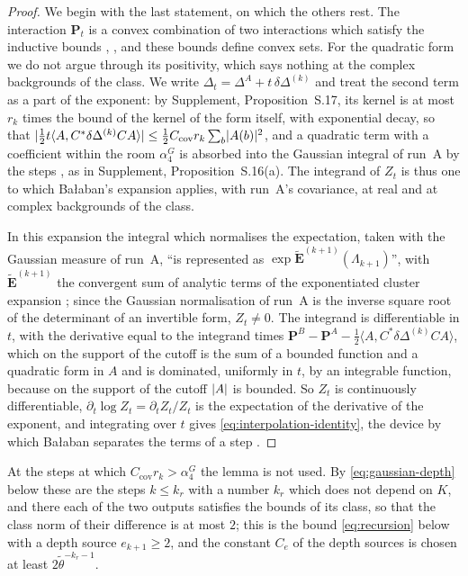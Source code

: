 \documentclass[11pt]{preprint}
\DeclarePairedDelimiter{\abs}{\lvert}{\rvert}
\numberwithin{equation}{section}
\theoremstyle{definition}
\theoremstyle{remark}
\theoremstyle{plain}
\begin{document}
\begin{proof}
We begin with the last statement, on which the others rest. The interaction $\mathbf P_t$ is a convex combination of two interactions which satisfy the inductive bounds \cite[(1.18), p.~263]{BalabanRG1}, \cite[(2.31), (2.42)]{BalabanCRE}, and these bounds define convex sets. For the quadratic form we do not argue through its positivity, which says nothing at the complex backgrounds of the class. We write $\Delta_t = \Delta^A + t\,\delta\Delta^{(k)}$ and treat the second term as a part of the exponent: by Supplement, Proposition~S.17, its kernel is at most $r_k$ times the bound of the kernel of the form itself, with exponential decay, so that $\abs{\frac12t\langle A, C^*\delta\Delta^{(k)}CA\rangle} \leq \frac12C_{\mathrm{cov}}r_k\sum_b\abs{A(b)}^2$, and a quadratic term with a coefficient within the room $\alpha^G_4$ is absorbed into the Gaussian integral of run~A by the steps \cite[(2.14)--(2.25), pp.~15--17]{BalabanRG2}, as in Supplement, Proposition~S.16(a). The integrand of $Z_t$ is thus one to which Ba{\l}aban's expansion applies, with run~A's covariance, at real and at complex backgrounds of the class.

In this expansion the integral which normalises the expectation, taken with the Gaussian measure of run~A, ``is represented as $\exp\tilde{\mathbf E}^{(k+1)}(\Lambda_{k+1})$'', with $\tilde{\mathbf E}^{(k+1)}$ the convergent sum of analytic terms of the exponentiated cluster expansion \cite[p.~277]{BalabanCRE}; since the Gaussian normalisation of run~A is the inverse square root of the determinant of an invertible form, $Z_t \neq 0$. The integrand is differentiable in $t$, with the derivative equal to the integrand times $\mathbf P^B - \mathbf P^A - \frac12\langle A, C^*\delta\Delta^{(k)}CA\rangle$, which on the support of the cutoff is the sum of a bounded function and a quadratic form in $A$ and is dominated, uniformly in $t$, by an integrable function, because on the support of the cutoff $\abs A$ is bounded. So $Z_t$ is continuously differentiable, $\partial_t\log Z_t = \partial_tZ_t/Z_t$ is the expectation of the derivative of the exponent, and integrating over $t$ gives \eqref{eq:interpolation-identity}, the device by which Ba{\l}aban separates the terms of a step \cite[(3.26)--(3.27), p.~271]{BalabanCRE}.
\end{proof}

At the steps at which $C_{\mathrm{cov}}r_k > \alpha^G_4$ the lemma is not used. By \eqref{eq:gaussian-depth} below these are the steps $k \leq k_r$ with a number $k_r$ which does not depend on $K$, and there each of the two outputs satisfies the bounds of its class, so that the class norm of their difference is at most $2$; this is the bound \eqref{eq:recursion} below with a depth source $e_{k+1} \geq 2$, and the constant $C_e$ of the depth sources is chosen at least $2\tilde\theta^{-k_r-1}$.
\end{document}
